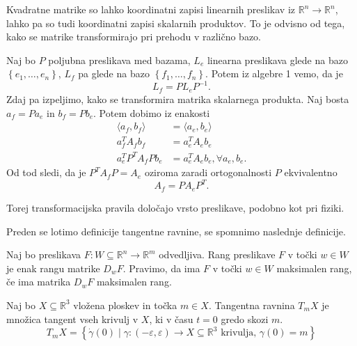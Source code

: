 \begin{opomba}
Kvadratne matrike so lahko koordinatni
zapisi linearnih preslikav iz $\mathbb{R}^n \to
\mathbb{R}^n$, lahko pa so tudi koordinatni zapisi
skalarnih produktov. To je odvisno od tega, kako se
matrike transformirajo pri prehodu v različno bazo.

Naj bo $P$ poljubna preslikava med bazama, $L_e$
linearna preslikava glede na bazo $\left\{ e_1, \ldots
, e_{n}\right\}$, $L_f$ pa glede na bazo $\left\{ f_1,
\ldots, f_{n}\right\}.$ Potem iz algebre 1 vemo, da je \begin{equation*}
L_f = PL_eP^{-1}. \end{equation*}Zdaj pa izpeljimo, kako se
transformira matrika skalarnega produkta. Naj bosta
$a_f = Pa_e$ in $b_f = Pb_e$. Potem dobimo iz enakosti
\begin{align*} \langle a_f, b_f \rangle &= \langle
a_e, b_e \rangle \\ a_f^{T} A_f b_f &= a_e^{T} A_e
b_e \\ a_e^{T} P^{T} A_f P b_e &= a_e^{T} A_e b_e,
\forall a_e, b_e. \end{align*} Od tod sledi, da je
$P^{T}A_fP = A_e$ oziroma zaradi ortogonalnosti
$P$ ekvivalentno \begin{equation*}A_f = PA_eP^{T}.\end{equation*}

Torej transformacijska pravila določajo vrsto
preslikave, podobno kot pri fiziki. 
\end{opomba}

Preden se lotimo definicije tangentne ravnine, se spomnimo naslednje
definicije. 

\begin{definicija}
\label{def_rang_preslikave}
 Naj bo preslikava $F: W \subseteq  \mathbb{R}^n \to  \mathbb{R}^m$ odvedljiva.
 Rang preslikave $F$ v točki $w \in  W$ je enak rangu matrike $D_wF$. Pravimo,
 da ima $F$ v točki $w \in  W$ maksimalen rang, če ima matrika $D_wF$
 maksimalen rang.
\end{definicija}


\begin{definicija} 
	\label{def_tangentna_ravnina}
	Naj bo $X \subseteq \mathbb{R}^3$ vložena ploskev in točka $m
\in X$. Tangentna ravnina $T_mX$ je množica tangent
vseh krivulj v $X$, ki v času $t = 0$ gredo skozi $m$.
\begin{equation*} T_mX = \left\{ \dot{\gamma}\left( 0 \right) \mid
\gamma : \left(  - \varepsilon, \varepsilon \right)
\to  X \subseteq  \mathbb{R}^3 \text{ krivulja, } \gamma\left(
0 \right) = m\right\} \end{equation*}
\end{definicija}


